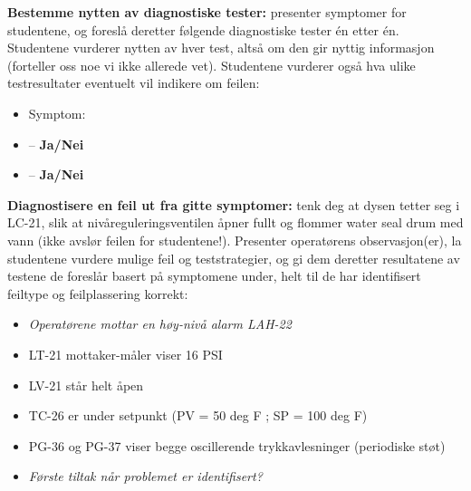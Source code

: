 \noindent
{\bf Bestemme nytten av diagnostiske tester:} presenter symptomer for studentene, og foreslå deretter følgende diagnostiske tester én etter én. Studentene vurderer nytten av hver test, altså om den gir nyttig informasjon (forteller oss noe vi ikke allerede vet). Studentene vurderer også hva ulike testresultater eventuelt vil indikere om feilen:

\begin{itemize}
\item{} Symptom: {\it }
\item{}  -- {\bf Ja/Nei}
\item{}  -- {\bf Ja/Nei}
\end{itemize}


\vskip 10pt


\noindent
{\bf Diagnostisere en feil ut fra gitte symptomer:} tenk deg at dysen tetter seg i LC-21, slik at nivåreguleringsventilen åpner fullt og flommer water seal drum med vann (ikke avslør feilen for studentene!). Presenter operatørens observasjon(er), la studentene vurdere mulige feil og teststrategier, og gi dem deretter resultatene av testene de foreslår basert på symptomene under, helt til de har identifisert feiltype og feilplassering korrekt:

\begin{itemize}
\item{} {\it Operatørene mottar en høy-nivå alarm LAH-22}
\item{} LT-21 mottaker-måler viser 16 PSI
\item{} LV-21 står helt åpen
\item{} TC-26 er under setpunkt (PV = 50 deg F ; SP = 100 deg F)
\item{} PG-36 og PG-37 viser begge oscillerende trykkavlesninger (periodiske støt)
\item{} {\it Første tiltak når problemet er identifisert?}
\end{itemize}



